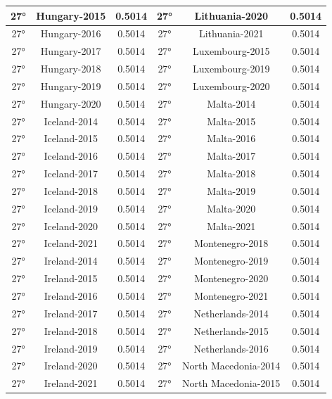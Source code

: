 \documentclass[a4paper,12pt, openright]{report}
\begin{document}
\begin{longtable}[c]{|c|c|c|c|c|c|}
    \hline
    27° & Hungary-2015  & 0.5014 & 27° & Lithuania-2020 & 0.5014 \\
    \hline
    27° &  Hungary-2016 & 0.5014 & 27° & Lithuania-2021 & 0.5014 \\
    \hline
    27° &  Hungary-2017 & 0.5014 & 27° & Luxembourg-2015 & 0.5014 \\
    \hline
    27° & Hungary-2018 & 0.5014 & 27° & Luxembourg-2019  & 0.5014 \\
    \hline
    27° &  Hungary-2019 & 0.5014 & 27° & Luxembourg-2020 & 0.5014 \\
    \hline
    27° & Hungary-2020  & 0.5014 & 27° & Malta-2014 & 0.5014 \\
    \hline
    27° &  Iceland-2014 & 0.5014 & 27° &  Malta-2015 & 0.5014\\
    \hline
    27° &  Iceland-2015 & 0.5014 & 27° & Malta-2016 & 0.5014\\
    \hline
    27° &  Iceland-2016 & 0.5014 & 27° & Malta-2017  & 0.5014 \\
    \hline
    27° &  Iceland-2017  & 0.5014  & 27° & Malta-2018 & 0.5014 \\
    \hline
    27° & Iceland-2018 & 0.5014 & 27° & Malta-2019 & 0.5014 \\
    \hline
    27° & Iceland-2019 & 0.5014 & 27° & Malta-2020 & 0.5014 \\
    \hline
    27° & Iceland-2020 & 0.5014 & 27° & Malta-2021 & 0.5014 \\
    \hline
    27° &  Iceland-2021 & 0.5014 & 27° & Montenegro-2018  & 0.5014 \\
    \hline
    27° & Ireland-2014  & 0.5014 & 27° & Montenegro-2019 & 0.5014 \\
    \hline
    27° & Ireland-2015 & 0.5014 & 27° & Montenegro-2020 & 0.5014 \\
    \hline
    27° & Ireland-2016 & 0.5014 & 27° & Montenegro-2021 & 0.5014 \\
    \hline
    27° & Ireland-2017 & 0.5014 & 27° & Netherlands-2014 & 0.5014 \\
    \hline
    27° & Ireland-2018 & 0.5014 & 27° & Netherlands-2015  & 0.5014 \\
    \hline
    27° &  Ireland-2019  & 0.5014 & 27° & Netherlands-2016 & 0.5014 \\
    \hline
    27° &  Ireland-2020 & 0.5014 & 27° & North Macedonia-2014 & 0.5014 \\
    \hline
    27° & Ireland-2021 & 0.5014 & 27° & North Macedonia-2015 & 0.5014 \\

\end{longtable}
\end{document}
